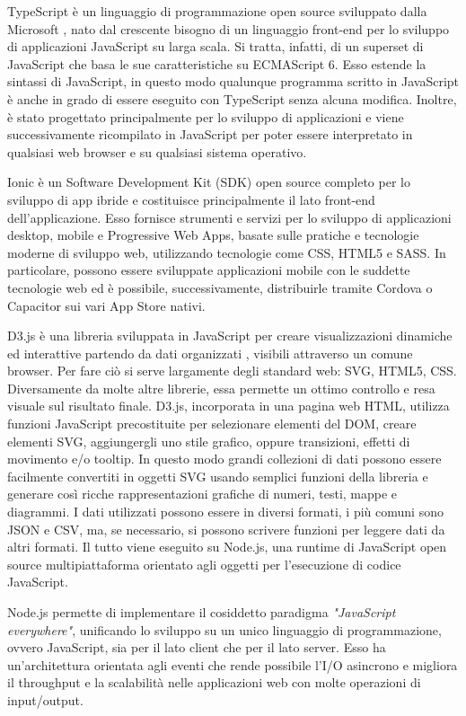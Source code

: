 TypeScript \`{e} un linguaggio di programmazione open source sviluppato dalla Microsoft \cite{typescript}, nato dal crescente bisogno di un linguaggio front-end per lo sviluppo di applicazioni JavaScript su larga scala. Si tratta, infatti, di un superset di JavaScript che basa le sue caratteristiche su ECMAScript 6. Esso estende la sintassi di JavaScript, in questo modo qualunque programma scritto in JavaScript \`{e} anche in grado di essere eseguito con TypeScript senza alcuna modifica. Inoltre, \`{e} stato progettato principalmente per lo sviluppo di applicazioni e viene successivamente ricompilato in JavaScript per poter essere interpretato in qualsiasi web browser e su qualsiasi sistema operativo.\par
Ionic \`{e} un Software Development Kit (SDK) open source completo per lo sviluppo di app ibride \cite{ionic} e costituisce principalmente il lato front-end dell'applicazione. Esso fornisce strumenti e servizi per lo sviluppo di applicazioni desktop, mobile e Progressive Web Apps, basate sulle pratiche e tecnologie moderne di sviluppo web, utilizzando tecnologie come CSS, HTML5 e SASS. In particolare, possono essere sviluppate applicazioni mobile con le suddette tecnologie web ed \`{e} possibile, successivamente, distribuirle tramite Cordova o Capacitor sui vari App Store nativi.\par
D3.js \`{e} una libreria sviluppata in JavaScript per creare visualizzazioni dinamiche ed interattive partendo da dati organizzati \cite{d3js}, visibili attraverso un comune browser. Per fare ci\`{o} si serve largamente degli standard web: SVG, HTML5, CSS. Diversamente da molte altre librerie, essa permette un ottimo controllo e resa visuale sul risultato finale. D3.js, incorporata in una pagina web HTML, utilizza funzioni JavaScript precostituite per selezionare elementi del DOM, creare elementi SVG, aggiungergli uno stile grafico, oppure transizioni, effetti di movimento e/o tooltip. In questo modo grandi collezioni di dati possono essere facilmente convertiti in oggetti SVG usando semplici funzioni della libreria e generare cos\`{i} ricche rappresentazioni grafiche di numeri, testi, mappe e diagrammi. I dati utilizzati possono essere in diversi formati, i pi\`{u} comuni sono JSON e CSV, ma, se necessario, si possono scrivere funzioni per leggere dati da altri formati. Il tutto viene eseguito su Node.js, una runtime di JavaScript open source multipiattaforma orientato agli oggetti per l'esecuzione di codice JavaScript. \cite{nodejs}\par
Node.js permette di implementare il cosiddetto paradigma \textit{"JavaScript everywhere"}, unificando lo sviluppo su un unico linguaggio di programmazione, ovvero JavaScript, sia per il lato client che per il lato server. Esso ha un'architettura orientata agli eventi che rende possibile l'I/O asincrono e migliora il throughput e la scalabilit\`{a} nelle applicazioni web con molte operazioni di input/output.

